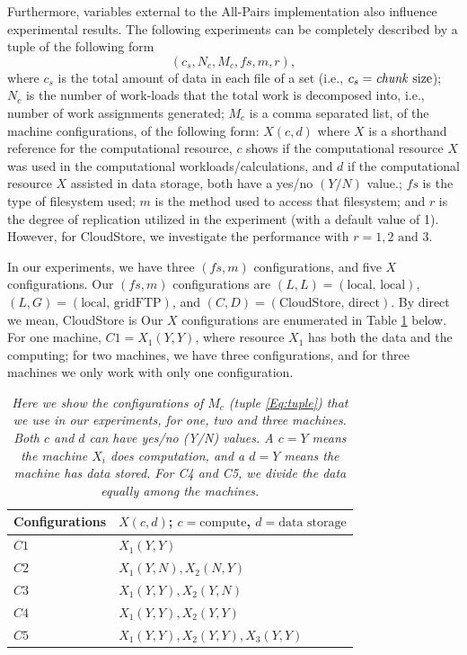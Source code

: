 \documentclass{rspublic}
\newcommand{\micnote}[1]{ {\textcolor{blue} { ***Michael: #1 }}}
\newcommand{\betynote}[1]{ {\textcolor{orange} { ***Bety: #1 }}}
\newcommand{\jhanote}[1]{} \newcommand{\micnote}[1]{}\newcommand{\betynote}[1]{} \newcommand{\fixme}[1]{}
\begin{document}
Furthermore, variables external to the All-Pairs implementation also
influence experimental results. The following experiments can be
completely described by a tuple of the following form
 \begin{equation}
(c_s, N_c, M_c, fs, m,r),
\label{Eq:tuple}
\end{equation}
where $c_s$ is the total amount of data in each file of a set (i.e.,
$c_s=\mbox{\textit{chunk} size}$); $N_c$ is the number of work-loads
that the total work is decomposed into, i.e., number of work
assignments generated; $M_c$ is a comma separated list, of the machine 
configurations, of the
following form: $X(c, d)$ where $X$ is a shorthand reference for the
computational resource, $c$ shows if the computational resource $X$
was used in the computational workloads/calculations, and $d$ if the
computational resource $X$ assisted in data storage, both have a
yes/no $(Y/N)$ value.; $fs$ is the type of filesystem used; $m$ is the
method used to access that filesystem; and $r$ is the degree of
replication utilized in the experiment (with a default value of 1).
 However, for CloudStore, we investigate the performance with 
 $r = 1, 2 \mbox{ and } 3$.

In our experiments, we have three $(fs, m)$ configurations, and five $X$
configurations. Our $(fs, m)$ configurations are $(L,L)=(\mbox{local,
local})$, $(L,G)=(\mbox{local, gridFTP})$, and $(C,D)=(\mbox{CloudStore,
direct})$. By direct we mean, CloudStore is \jhanote{Finish this
setence!} Our $X$ configurations are enumerated in Table
\ref{Tab:Configs} below.  For one machine, $C1=X_1(Y,Y)$, where resource
$X_1$ has both the data and the computing; for two machines, we have
three configurations, and for three machines we only work with only one
configuration.

\begin{table}
\begin{center}
    \begin{tabular}{ | l | l |}
    \hline
    Configurations & $X(c,d)$; $c= \mbox{compute}$, $d=\mbox{data storage}$  \\ \hline
    $C1$ & $X_1(Y,Y)$  \\ \hline    
    $C2$ & $X_1(Y,N), X_2(N,Y)$ \\ \hline
    $C3$ & $X_1(Y,Y), X_2(Y,N)$ \\ \hline
    $C4$ & $X_1(Y,Y), X_2(Y,Y)$ \\ \hline
    $C5$ & $X_1(Y,Y), X_2(Y,Y), X_3(Y,Y)$ \\ 
    \hline
    \end{tabular}
\end{center}
    \caption{\textit{Here we show the configurations of $M_c$ (tuple
\ref{Eq:tuple}) that we use in our experiments, for one, two and three
machines. Both $c$ and $d$ can have yes/no (Y/N) values. A $c = Y$ means
the machine $X_i$ does computation, and a $d = Y$ means the machine has
data stored. For C4 and C5, we divide the data equally among the
machines.}}
    \label{Tab:Configs}
\end{table}
\end{document}
